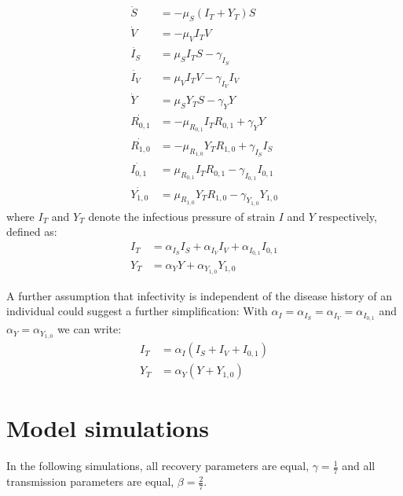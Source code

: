 \documentclass[10pt,a4paper]{article}
\begin{document}
\begin{align}
    \dot{S} &= - \mu_S (I_T + Y_T) S \\ 
    \dot{V} &= - \mu_V I_T V \\ 
    \dot{I_S} &= \mu_S I_T S - \gamma_{I_S} \\ 
    \dot{I_V} &= \mu_V I_T V - \gamma_{I_V} I_V \\
    \dot{Y} &= \mu_S Y_T S - \gamma_{Y} Y \\
    \dot{R_{0,1}} &= - \mu_{R_{0,1}} I_T R_{0,1} + \gamma_{Y} Y \\ 
    \dot{R_{1,0}} &= - \mu_{R_{1,0}} Y_T R_{1,0} + \gamma_{I_S} I_S \\
    \dot{I_{0,1}} &=   \mu_{R_{0,1}} I_T R_{0,1} - \gamma_{I_{0,1}} I_{0,1} \\ 
    \dot{Y_{1,0}} &=   \mu_{R_{1,0}} Y_T R_{1,0} - \gamma_{Y_{1,0}} Y_{1,0} 
\end{align}
where $I_T$ and $Y_T$ denote the infectious pressure of strain $I$ and $Y$ respectively, defined as:
\begin{align}
    I_T &= \alpha_{I_S} I_S + \alpha_{I_V} I_V + \alpha_{I_{0,1}} I_{0,1} \\ 
    Y_T &= \alpha_{Y} Y + \alpha_{Y_{1,0}} Y_{1,0} 
\end{align}

A further assumption that infectivity is independent of the disease history of an individual could suggest a further simplification:
With $\alpha_I = \alpha_{I_S} = \alpha_{I_V} = \alpha_{I_{0,1}}$ and $\alpha_Y = \alpha_{Y_{1,0}}$ we can write:
\begin{align}
    I_T &= \alpha_I \left(I_S + I_V + I_{0,1} \right)\\ 
    Y_T &= \alpha_{Y} \left(Y + Y_{1,0} \right)
\end{align}

\section{Model simulations}
In the following simulations, all recovery parameters are equal, $\gamma = \frac{1}{7}$ and all transmission parameters are equal, $\beta= \frac{2}{7}$.
\end{document}
